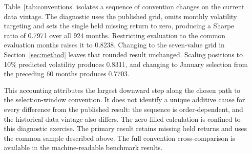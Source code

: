 Table~\ref{tab:conventions} isolates a sequence of convention changes on the current data vintage. The diagnostic uses the published grid, omits monthly volatility targeting and sets the single held missing return to zero, producing a Sharpe ratio of 0.7971 over all 924 months. Restricting evaluation to the common evaluation months raises it to 0.8238. Changing to the seven-value grid in Section~\ref{sec:method} leaves that rounded result unchanged. Scaling positions to 10\% predicted volatility produces 0.8311, and changing to January selection from the preceding 60 months produces 0.7703.

This accounting attributes the largest downward step along the chosen path to the selection-window convention. It does not identify a unique additive cause for every difference from the published result: the sequence is order-dependent, and the historical data vintage also differs. The zero-filled calculation is confined to this diagnostic exercise. The primary result retains missing held returns and uses the common sample described above. The full convention cross-comparison is available in the machine-readable benchmark results.

